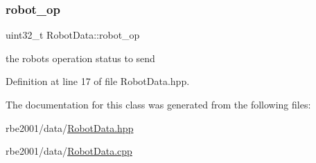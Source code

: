 \subsubsection{\texorpdfstring{robot\+\_\+op}{robot\_op}}
{\footnotesize\ttfamily uint32\+\_\+t Robot\+Data\+::robot\+\_\+op\hspace{0.3cm}{\ttfamily [private]}}



the robot\textquotesingle{}s operation status to send 



Definition at line 17 of file Robot\+Data.\+hpp.



The documentation for this class was generated from the following files\+:\begin{DoxyCompactItemize}
\item 
rbe2001/data/\hyperlink{_robot_data_8hpp}{Robot\+Data.\+hpp}\item 
rbe2001/data/\hyperlink{_robot_data_8cpp}{Robot\+Data.\+cpp}\end{DoxyCompactItemize}
